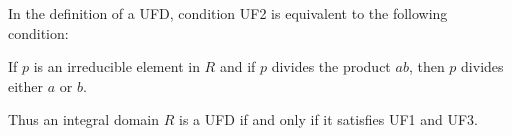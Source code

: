 In the definition of a UFD, condition UF2 is equivalent to the following condition:

 If $p$ is an irreducible element in $R$ and if $p$ divides the product $ab$, then $p$ divides either $a$ or $b$.

Thus an integral domain $R$ is a UFD if and only if it satisfies UF1 and UF3.
